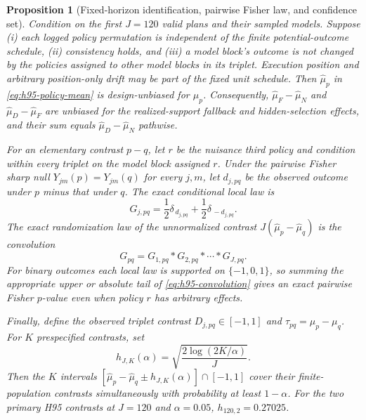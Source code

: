 \documentclass[11pt]{article}
\newcommand{\1}{\mathbf{1}}
\newtheorem{proposition}{Proposition}
\begin{document}
\begin{proposition}[Fixed-horizon identification, pairwise Fisher law, and confidence set]
\label{prop:h95-fixed-horizon}
Condition on the first $J=120$ valid plans and their sampled models.  Suppose
(i) each logged policy permutation is independent of the finite potential-outcome
schedule, (ii) consistency holds, and (iii) a model block's outcome is not changed
by the policies assigned to other model blocks in its triplet.  Execution position
and arbitrary position-only drift may be part of the fixed unit schedule.  Then
$\widehat\mu_p$ in \cref{eq:h95-policy-mean} is design-unbiased for $\mu_p$.
Consequently, $\widehat\mu_F-\widehat\mu_N$ and
$\widehat\mu_D-\widehat\mu_F$ are unbiased for the realized-support fallback and
hidden-selection effects, and their sum equals
$\widehat\mu_D-\widehat\mu_N$ pathwise.

For an elementary contrast $p-q$, let $r$ be the nuisance third policy and
condition within every triplet on the model block assigned $r$.  Under the
pairwise Fisher sharp null $Y_{jm}(p)=Y_{jm}(q)$ for every $j,m$, let $d_{j,pq}$
be the observed outcome under $p$ minus that under $q$.  The exact conditional
local law is
\begin{equation}
 G_{j,pq}=\frac{1}{2}\delta_{\,d_{j,pq}}
          +\frac{1}{2}\delta_{\,-d_{j,pq}}.
 \label{eq:h95-local-law}
\end{equation}
The exact randomization law of the unnormalized contrast
$J(\widehat\mu_p-\widehat\mu_q)$ is the convolution
\begin{equation}
 G_{pq}=G_{1,pq}*G_{2,pq}*\cdots*G_{J,pq}.
 \label{eq:h95-convolution}
\end{equation}
For binary outcomes each local law is supported on $\{-1,0,1\}$, so summing the
appropriate upper or absolute tail of \cref{eq:h95-convolution} gives an exact
pairwise Fisher $p$-value even when policy $r$ has arbitrary effects.

Finally, define the observed triplet contrast $D_{j,pq}\in[-1,1]$ and
$\tau_{pq}=\mu_p-\mu_q$.  For $K$ prespecified contrasts, set
\begin{equation}
 h_{J,K}(\alpha)=\sqrt{\frac{2\log(2K/\alpha)}{J}}.
 \label{eq:h95-hoeffding-radius}
\end{equation}
Then the $K$ intervals
$[\widehat\mu_p-\widehat\mu_q\pm h_{J,K}(\alpha)]\cap[-1,1]$
cover their finite-population contrasts simultaneously with probability at
least $1-\alpha$.  For the two primary H95 contrasts at $J=120$ and
$\alpha=0.05$, $h_{120,2}=0.27025$.
\end{proposition}
\end{document}
